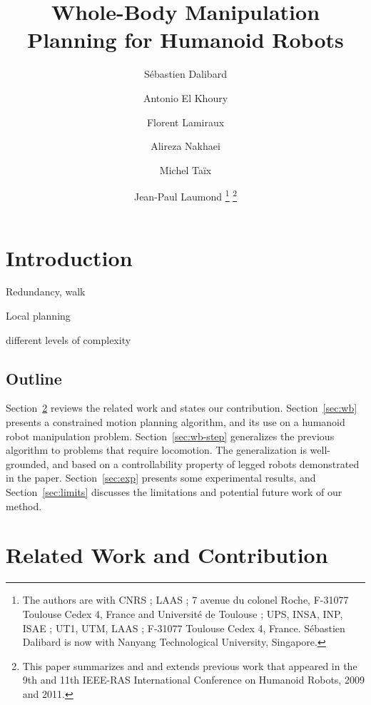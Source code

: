 \documentclass{article}
\begin{document}
\title{Whole-Body Manipulation Planning for Humanoid Robots}

\author{
  S\'ebastien Dalibard\and
  Antonio El Khoury\and
  Florent Lamiraux\and
  Alireza Nakhaei\and
  Michel Ta\"ix\and
  Jean-Paul Laumond
  \footnote{The authors are with CNRS ; LAAS ; 7 avenue du colonel Roche, F-31077
    Toulouse Cedex 4, France and Universit\'e de Toulouse ; UPS, INSA, INP, ISAE ;
    UT1, UTM, LAAS ; F-31077 Toulouse
    Cedex 4, France. S\'ebastien Dalibard is now with Nanyang Technological University, Singapore.}
  \footnote{
    This paper summarizes and and extends previous work that appeared in the 9th and 11th
    IEEE-RAS International Conference on Humanoid Robots, 2009 and 2011.
  }
}

\date{}

\maketitle

\begin{abstract}

\end{abstract}

\section{Introduction}

Redundancy, walk

Local planning

different levels of complexity

\subsection{Outline}
Section~\ref{sec:related} reviews the related work and states our contribution. 
Section~\ref{sec:wb} presents a constrained motion planning algorithm, and its
use on a humanoid robot manipulation problem. Section~\ref{sec:wb-step} generalizes
the previous algorithm to problems that require locomotion. The generalization is
well-grounded, and
based on a controllability property of legged robots demonstrated in the paper. 
Section~\ref{sec:exp} presents some experimental results, and 
Section~\ref{sec:limits} discusses the limitations and potential future work of our
method.


\section{Related Work and Contribution}
\label{sec:related}
\end{document}
